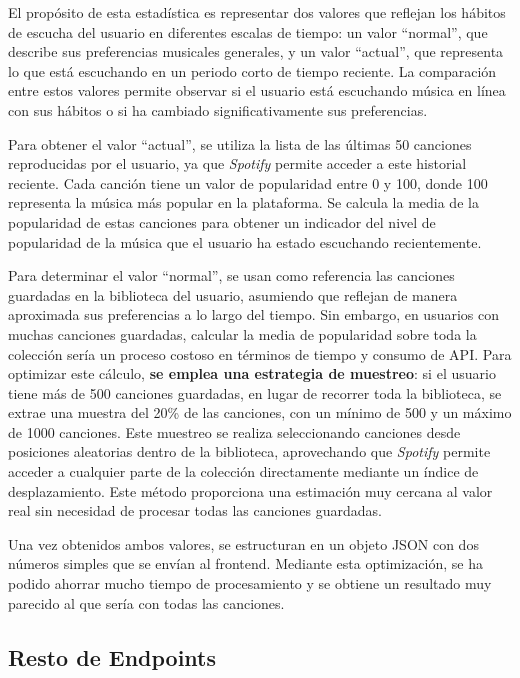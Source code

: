 El propósito de esta estadística es representar dos valores que reflejan los hábitos de escucha del usuario en diferentes escalas de tiempo: un valor ``normal'', que describe sus preferencias musicales generales, y un valor ``actual'', que representa lo que está escuchando en un periodo corto de tiempo reciente. La comparación entre estos valores permite observar si el usuario está escuchando música en línea con sus hábitos o si ha cambiado significativamente sus preferencias.

Para obtener el valor ``actual'', se utiliza la lista de las últimas 50 canciones reproducidas por el usuario, ya que \textit{Spotify} permite acceder a este historial reciente. Cada canción tiene un valor de popularidad entre 0 y 100, donde 100 representa la música más popular en la plataforma. Se calcula la media de la popularidad de estas canciones para obtener un indicador del nivel de popularidad de la música que el usuario ha estado escuchando recientemente.

Para determinar el valor ``normal'', se usan como referencia las canciones guardadas en la biblioteca del usuario, asumiendo que reflejan de manera aproximada sus preferencias a lo largo del tiempo. Sin embargo, en usuarios con muchas canciones guardadas, calcular la media de popularidad sobre toda la colección sería un proceso costoso en términos de tiempo y consumo de API. Para optimizar este cálculo, \textbf{se emplea una estrategia de muestreo}: si el usuario tiene más de 500 canciones guardadas, en lugar de recorrer toda la biblioteca, se extrae una muestra del 20\% de las canciones, con un mínimo de 500 y un máximo de 1000 canciones. Este muestreo se realiza seleccionando canciones desde posiciones aleatorias dentro de la biblioteca, aprovechando que \textit{Spotify} permite acceder a cualquier parte de la colección directamente mediante un índice de desplazamiento. Este método proporciona una estimación muy cercana al valor real sin necesidad de procesar todas las canciones guardadas.

Una vez obtenidos ambos valores, se estructuran en un objeto JSON con dos números simples que se envían al frontend. Mediante esta optimización, se ha podido ahorrar mucho tiempo de procesamiento y se obtiene un resultado muy parecido al que sería con todas las canciones.

\subsection{Resto de Endpoints}

